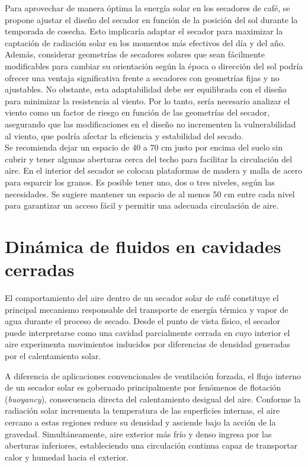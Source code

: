 Para aprovechar de manera óptima la energía solar en los secadores de café, se propone ajustar el diseño del secador en función de la posición del sol durante la temporada de cosecha. Esto implicaría adaptar el secador para maximizar la captación de radiación solar en los momentos más efectivos del día y del año. Además, considerar geometrías de secadores solares que sean fácilmente modificables para cambiar su orientación según la época o dirección del sol podría ofrecer una ventaja significativa frente a secadores con geometrías fijas y no ajustables. No obstante, esta adaptabilidad debe ser equilibrada con el diseño para minimizar la resistencia al viento. Por lo tanto, sería necesario analizar el viento como un factor de riesgo en función de las geometrías del secador, asegurando que las modificaciones en el diseño no incrementen la vulnerabilidad al viento, que podría afectar la eficiencia y estabilidad del secado.\\

Se recomienda dejar un espacio de 40 a 70 cm justo por encima del suelo sin cubrir y tener algunas aberturas cerca del techo para facilitar la circulación del aire. En el interior del secador se colocan plataformas de madera y malla de acero para esparcir los granos. Es posible tener uno, dos o tres niveles, según las necesidades. Se sugiere mantener un espacio de al menos 50 cm entre cada nivel para garantizar un acceso fácil y permitir una adecuada circulación de aire.\\

\section{Dinámica de fluidos en cavidades cerradas}
El comportamiento del aire dentro de un secador solar de café constituye el principal mecanismo responsable del transporte de energía térmica y vapor de agua durante el proceso de secado. Desde el punto de vista físico, el secador puede interpretarse como una cavidad parcialmente cerrada en cuyo interior el aire experimenta movimientos inducidos por diferencias de densidad generadas por el calentamiento solar.

A diferencia de aplicaciones convencionales de ventilación forzada, el flujo interno de un secador solar es gobernado principalmente por fenómenos de flotación (\textit{buoyancy}), consecuencia directa del calentamiento desigual del aire. Conforme la radiación solar incrementa la temperatura de las superficies internas, el aire cercano a estas regiones reduce su densidad y asciende bajo la acción de la gravedad. Simultáneamente, aire exterior más frío y denso ingresa por las aberturas inferiores, estableciendo una circulación continua capaz de transportar calor y humedad hacia el exterior.


